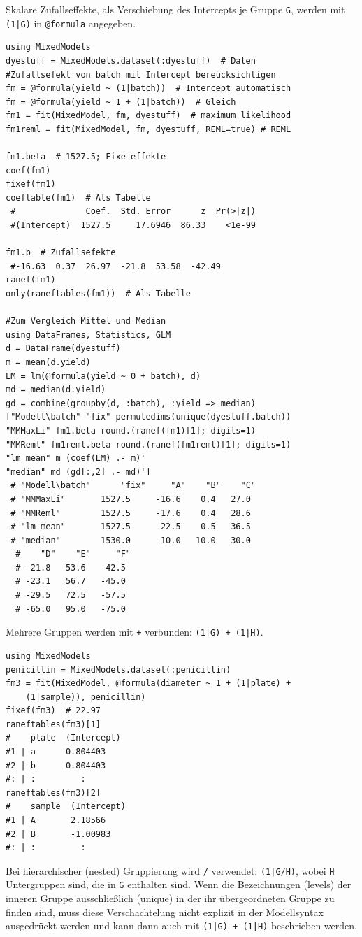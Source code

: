 \documentclass[10pt,twocolumn]{scrartcl}
\begin{document}
Skalare Zufallseffekte, als Verschiebung des Intercepts je Gruppe
\lstinline|G|, werden mit \lstinline"(1|G)" in \lstinline|@formula|
angegeben.

\begin{lstlisting}
using MixedModels
dyestuff = MixedModels.dataset(:dyestuff)  # Daten
#Zufallsefekt von batch mit Intercept bereücksichtigen
fm = @formula(yield ~ (1|batch))  # Intercept automatisch
fm = @formula(yield ~ 1 + (1|batch))  # Gleich
fm1 = fit(MixedModel, fm, dyestuff)  # maximum likelihood
fm1reml = fit(MixedModel, fm, dyestuff, REML=true) # REML

fm1.beta  # 1527.5; Fixe effekte
coef(fm1)
fixef(fm1)
coeftable(fm1)  # Als Tabelle
 #              Coef.  Std. Error      z  Pr(>|z|)
 #(Intercept)  1527.5     17.6946  86.33    <1e-99

fm1.b  # Zufallsefekte
 #-16.63  0.37  26.97  -21.8  53.58  -42.49
ranef(fm1)
only(raneftables(fm1))  # Als Tabelle

#Zum Vergleich Mittel und Median
using DataFrames, Statistics, GLM
d = DataFrame(dyestuff)
m = mean(d.yield)
LM = lm(@formula(yield ~ 0 + batch), d)
md = median(d.yield)
gd = combine(groupby(d, :batch), :yield => median)
["Modell\batch" "fix" permutedims(unique(dyestuff.batch))
"MMMaxLi" fm1.beta round.(ranef(fm1)[1]; digits=1)
"MMReml" fm1reml.beta round.(ranef(fm1reml)[1]; digits=1)
"lm mean" m (coef(LM) .- m)'
"median" md (gd[:,2] .- md)']
 # "Modell\batch"      "fix"     "A"    "B"    "C"
 # "MMMaxLi"       1527.5     -16.6    0.4   27.0
 # "MMReml"        1527.5     -17.6    0.4   28.6
 # "lm mean"       1527.5     -22.5    0.5   36.5
 # "median"        1530.0     -10.0   10.0   30.0
  #    "D"    "E"     "F"
  # -21.8   53.6   -42.5
  # -23.1   56.7   -45.0
  # -29.5   72.5   -57.5
  # -65.0   95.0   -75.0
\end{lstlisting}

Mehrere Gruppen werden mit \lstinline|+| verbunden: \lstinline"(1|G) + (1|H)".

\begin{lstlisting}
using MixedModels
penicillin = MixedModels.dataset(:penicillin)
fm3 = fit(MixedModel, @formula(diameter ~ 1 + (1|plate) +
    (1|sample)), penicillin)
fixef(fm3)  # 22.97
raneftables(fm3)[1]
#    plate  (Intercept)
#1 | a      0.804403
#2 | b      0.804403
#: | :         :
raneftables(fm3)[2]
#    sample  (Intercept)
#1 | A       2.18566
#2 | B       -1.00983
#: | :         :
\end{lstlisting}

Bei hierarchischer (nested) Gruppierung wird \lstinline|/| verwendet:
\lstinline"(1|G/H)", wobei \lstinline|H| Untergruppen sind, die in \lstinline|G|
enthalten sind. Wenn die Bezeichnungen (levels) der inneren Gruppe
ausschließlich (unique) in der ihr übergeordneten Gruppe zu finden sind, muss
diese Verschachtelung nicht explizit in der Modellsyntax ausgedrückt werden und
kann dann auch mit \lstinline"(1|G) + (1|H)" beschrieben werden.
\end{document}
